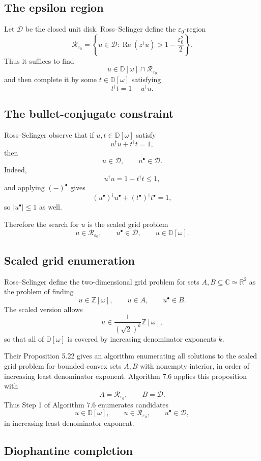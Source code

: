 \documentclass[11pt]{article}
\newcommand{\C}{\mathbb C}
\newcommand{\R}{\mathbb R}
\newcommand{\Dw}{\mathbb D[\omega]}
\newcommand{\Zw}{\mathbb Z[\omega]}
\newcommand{\eps}{\varepsilon}
\begin{document}
\subsection{The epsilon region}

Let $\mathcal D$ be the closed unit disk. Ross--Selinger define the $\eps_0$-region
\[
  \mathcal R_{\eps_0}
  =
  \left\{u\in\mathcal D:
  \operatorname{Re}(z^\dagger u)>1-\frac{\eps_0^2}{2}
  \right\}.
\]
Thus it suffices to find
\[
  u\in\Dw\cap \mathcal R_{\eps_0}
\]
and then complete it by some $t\in\Dw$ satisfying
\[
  t^\dagger t=1-u^\dagger u.
\]

\subsection{The bullet-conjugate constraint}

Ross--Selinger observe that if $u,t\in\Dw$ satisfy
\[
  u^\dagger u+t^\dagger t=1,
\]
then
\[
  u\in\mathcal D,
  \qquad
  u^\bullet\in\mathcal D.
\]
Indeed,
\[
  u^\dagger u=1-t^\dagger t\le1,
\]
and applying $(-)^\bullet$ gives
\[
  (u^\bullet)^\dagger u^\bullet+(t^\bullet)^\dagger t^\bullet=1,
\]
so $|u^\bullet|\le1$ as well.

Therefore the search for $u$ is the scaled grid problem
\[
  u\in \mathcal R_{\eps_0},
  \qquad
  u^\bullet\in\mathcal D,
  \qquad
  u\in\Dw.
\]

\subsection{Scaled grid enumeration}

Ross--Selinger define the two-dimensional grid problem for sets $A,B\subseteq\C\simeq\R^2$ as the problem of finding
\[
  u\in\Zw,
  \qquad
  u\in A,
  \qquad
  u^\bullet\in B.
\]
The scaled version allows
\[
  u\in \frac1{(\sqrt2)^k}\Zw,
\]
so that all of $\Dw$ is covered by increasing denominator exponents $k$.

Their Proposition 5.22 gives an algorithm enumerating all solutions to the scaled grid problem for bounded convex sets $A,B$ with nonempty interior, in order of increasing least denominator exponent. Algorithm 7.6 applies this proposition with
\[
  A=\mathcal R_{\eps_0},
  \qquad
  B=\mathcal D.
\]
Thus Step 1 of Algorithm 7.6 enumerates candidates
\[
  u\in\Dw,
  \qquad
  u\in\mathcal R_{\eps_0},
  \qquad
  u^\bullet\in\mathcal D,
\]
in increasing least denominator exponent.

\subsection{Diophantine completion}
\end{document}
